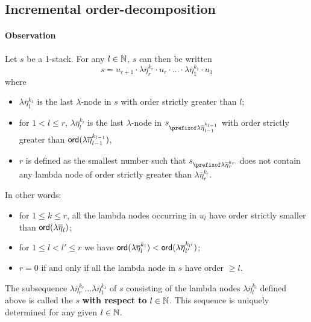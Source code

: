 \documentclass[a4paper,draft]{article}
\theoremstyle{remark}
\theoremstyle{definition}
\begin{document}
\subsection{Incremental order-decomposition}
\paragraph{Observation}
Let $s$ be a 1-stack. For any $l\in \mathbb{N}$, $s$ can then be written
$$ s = u_{r+1} \cdot \lambda \overline{\eta}_r^{k_r} \cdot u_r \cdot
\ldots \cdot \lambda \overline{\eta}_1^{k_1} \cdot  u_1 $$
where
\begin{itemize}
\item  $\lambda \overline{\eta}_1^{k_1}$ is the
last $\lambda$-node in $s$ with order strictly greater than $l$;

\item for $1 < l \leq r$, $\lambda
\overline{\eta}_l^{k_l}$ is the last $\lambda$-node in $s_{\prefixof
\lambda \overline{\eta}_{l-1}^{k_{l-1}}}$ with order strictly
greater than ${\sf ord}(\lambda \overline{\eta}_{l-1}^{k_{l-1}})$,

\item  $r$ is defined as the smallest number such that
$s_{\prefixof \lambda \overline{\eta}_{r}^{k_{r}}}$ does not contain
any lambda node of order strictly greater than $\lambda
\overline{\eta}_{r}^{k_{r}}$.
\end{itemize}

\noindent In other words:
\begin{itemize}
\item for $1 \leq k \leq r$, all the lambda nodes occurring in $u_l$ have order
strictly smaller than ${\sf ord}(\lambda \overline{\eta}_l)$;
\item for $1\leq l<l'\leq r$ we have ${\sf ord}(\lambda \overline{\eta}_l^{k_l})
< {\sf ord}(\lambda \overline{\eta}_{l'}^{k_{l'}})$;
\item $r=0$ if and only if all the lambda node in $s$ have order $\geq l$.
\end{itemize}

The subsequence $\lambda \overline{\eta}_r^{k_r} \ldots \lambda\overline{\eta}_1^{k_1}$ of $s$ consisting of the lambda nodes $\lambda
\overline{\eta}_l^{k_l}$ defined above is called the  $s$ {\bf with respect to} $l\in\mathbb{N}$.
This sequence is uniquely determined for any given $l\in \mathbb{N}$.

\smallskip
\end{document}
